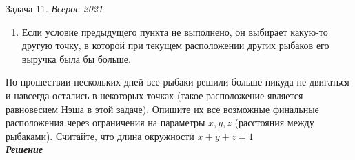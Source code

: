 \begin{mybox}{Задача 11. \textit{Всерос 2021}}
\begin{enumerate}
        размещения (с учетом фактического положения двух других), то на следующий день он остается в той же точке.
        \item Если условие предыдущего пункта не выполнено, он выбирает какую-то другую точку, в которой при текущем
        расположении других рыбаков его выручка была бы больше.
    \end{enumerate}
    \indent\setlength{\parindent}{1em}По прошествии нескольких дней все рыбаки решили больше никуда не двигаться и
    навсегда остались в некоторых точках (такое расположение является равновесием Нэша в этой задаче). Опишите их все
    возможные финальные расположения через ограничения на параметры $x,y,z$ (расстояния между рыбаками). Считайте, что
    длина окружности $x+y+z=1$\bigskip\\
    \textit{\textbf{\centering\href{https://iloveeconomics.ru/sites/default/files/olimp/vseros/2021/vseros_2021_solutions_10_21648.pdf}{Решение}}}
\end{mybox}


